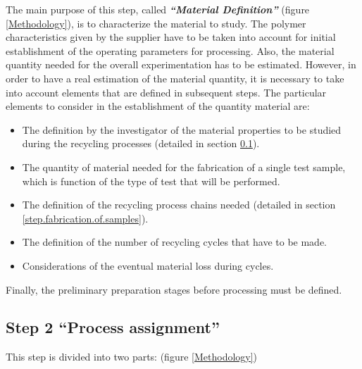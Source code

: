 	The main purpose of this step, called  \textit{\textbf{``Material Definition''}}  (figure \ref{Methodology}),  is to characterize the material to  study.  
	The polymer characteristics given by the supplier have to be taken into account for initial establishment of the operating parameters for processing. 
	Also, the material quantity needed for the overall experimentation has to be estimated. 
	However, in order to have a real estimation of the material quantity, it is necessary to take into account elements that are defined in subsequent steps.
	The particular elements  to consider in the establishment of the quantity material are:


\begin{itemize}[noitemsep]
	\item The definition by the investigator of the material properties to be studied during the recycling processes (detailed in section \ref{step.processes}).
	\item The quantity of material needed for the fabrication of a single test sample, which is function of the type of test that will be performed.
	\item The definition of the recycling process chains needed  (detailed in section \ref{step.fabrication.of.samples}).
	\item	The definition  of the number  of  recycling cycles that have to be made.
	\item Considerations of the eventual  material loss  during cycles.
\end{itemize}

Finally, the preliminary preparation stages before  processing must be defined.



\subsection{ Step 2 ``Process assignment''}
\label{step.processes}	

This step is divided into two parts: (figure \ref{Methodology})  

